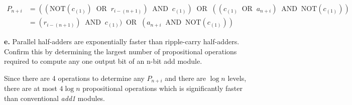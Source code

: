 \documentclass[12pt]{article}
\begin{document}
\begin{align*}
P_{n + i} &= ((\text{NOT}(c_{(1)})\;\;\text{OR}\;\;r_{i - (n + 1)})\;\;\text{AND}\;\;c_{(1)})\;\;\text{OR}\;\;((c_{(1)}\;\;\text{OR}\;\;a_{n + i})\;\;\text{AND}\;\;\text{NOT}(c_{(1)})) \\
&= (r_{i - (n + 1)})\;\;\text{AND}\;\;c_{(1)})\;\;\text{OR}\;\;(a_{n + i}\;\;\text{AND}\;\;\text{NOT}(c_{(1)}))
\end{align*}
\par{\textbf{e.} Parallel half-adders are exponentially faster than ripple-carry half-adders. Confirm this by determining the largest number of propositional operations required to compute any one output bit of an n-bit add module.}
\newline
\par{Since there are 4 operations to determine any $P_{n + i}$ and there are $\log{n}$ levels, there are at most $4\log{n}$ propositional operations which is significantly faster than conventional \textit{add1} modules.}
\end{document}
